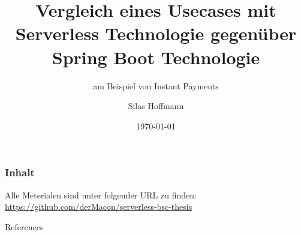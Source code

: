 \documentclass[10pt]{beamer}
\title{Vergleich eines Usecases mit Serverless Technologie gegenüber Spring Boot Technologie}
\subtitle{am Beispiel von Instant Payments}
\date{\today}
\author{Silas Hoffmann}
\institute{Fachhochschule Wedel}
\begin{document}
\maketitle

\begin{frame}
\frametitle{Inhalt}
\tableofcontents
\end{frame}







\maketitle

\appendix


\begin{frame}[standout]

{\normalsize Alle Meterialen sind unter folgender URL zu finden: \\ \url{https://github.com/derMacon/serverless-bsc-thesis}}
\end{frame}

\begin{frame}[allowframebreaks]{References}
  \nocite{*} 
  
  
\end{frame}
\end{document}
